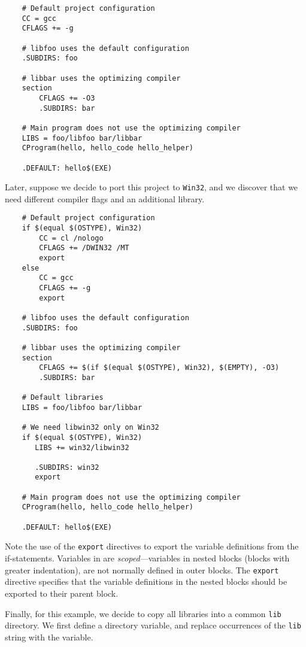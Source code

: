 \begin{verbatim}
    # Default project configuration
    CC = gcc
    CFLAGS += -g

    # libfoo uses the default configuration
    .SUBDIRS: foo

    # libbar uses the optimizing compiler
    section
        CFLAGS += -O3
        .SUBDIRS: bar

    # Main program does not use the optimizing compiler
    LIBS = foo/libfoo bar/libbar
    CProgram(hello, hello_code hello_helper)

    .DEFAULT: hello$(EXE)
\end{verbatim}

Later, suppose we decide to port this project to \verb+Win32+, and we discover that we need
different compiler flags and an additional library.

\begin{verbatim}
    # Default project configuration
    if $(equal $(OSTYPE), Win32)
        CC = cl /nologo
        CFLAGS += /DWIN32 /MT
        export
    else
        CC = gcc
        CFLAGS += -g
        export

    # libfoo uses the default configuration
    .SUBDIRS: foo

    # libbar uses the optimizing compiler
    section
        CFLAGS += $(if $(equal $(OSTYPE), Win32), $(EMPTY), -O3)
        .SUBDIRS: bar

    # Default libraries
    LIBS = foo/libfoo bar/libbar

    # We need libwin32 only on Win32
    if $(equal $(OSTYPE), Win32)
       LIBS += win32/libwin32

       .SUBDIRS: win32
       export

    # Main program does not use the optimizing compiler
    CProgram(hello, hello_code hello_helper)

    .DEFAULT: hello$(EXE)
\end{verbatim}

Note the use of the \verb+export+ directives to export the variable definitions from the
if-statements.  Variables in  are \emph{scoped}---variables in nested blocks (blocks
with greater indentation), are not normally defined in outer blocks.  The \verb+export+ directive
specifies that the variable definitions in the nested blocks should be exported to their parent
block.

Finally, for this example, we decide to copy all libraries into a common \verb+lib+ directory.  We
first define a directory variable, and replace occurrences of the \verb+lib+ string with the
variable.

